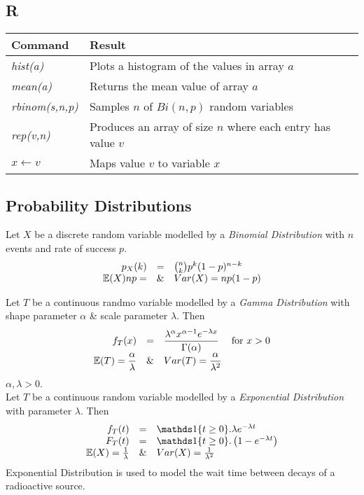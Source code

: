 \documentclass[11pt,a4paper]{article}
\begin{document}
\subsection{R} 
\begin{tabular}{|l|l|}
\hline
Command&Result\\
\hline
\textit{hist(a)}&Plots a histogram of the values in array $a$\\
\textit{mean(a)}&Returns the mean value of array $a$\\
\textit{rbinom(s,n,p)}&Samples $n$ of $Bi(n,p)$ random variables\\
\textit{rep(v,n)}&Produces an array of size $n$ where each entry has value $v$\\
$x\leftarrow v$&Maps value $v$ to variable $x$\\
\hline
\end{tabular}

\subsection{Probability Distributions}

Let $X$ be a discrete random variable modelled by a \textit{Binomial Distribution} with $n$ events and rate of success $p$.\\
\[\begin{array}{rcl}
p_X(k)&=&{n\choose k}p^k(1-p)^{n-k}\\
\mathbb{E}(X)np=&\&&Var(X)=np(1-p)
\end{array}\]

Let $T$ be a continuous randmo variable modelled by a \textit{Gamma Distribution} with shape parameter $\alpha$ \& scale parameter $\lambda$. Then
\[\begin{array}{rcll}
f_T(x)&=&\dfrac{\lambda^\alpha x^{\alpha-1}e^{-\lambda x}}{\Gamma(\alpha)}&\mathrm{for\ }x>0\\
\mathbb{E}(T)=\dfrac{\alpha}{\lambda}&\&&Var(T)=\dfrac{\alpha}{\lambda^2}
\end{array}\]
\nb $\alpha,\lambda>0$.\\

Let $T$ be a continuous random variable modelled by a \textit{Exponential Distribution} with parameter $\lambda$. Then
\[\begin{array}{rcl}
f_T(t)&=&\indicator\{t\geq0\}.\lambda e^{-\lambda t}\\
F_T(t)&=&\indicator\{t\geq0\}.\left(1-e^{-\lambda t}\right)\\
\expect(X)=\frac{1}{\lambda}&\&&Var(X)=\frac{1}{\lambda^2}
\end{array}\]
\nb Exponential Distribution is used to model the wait time between decays of a radioactive source.\\
\end{document}
